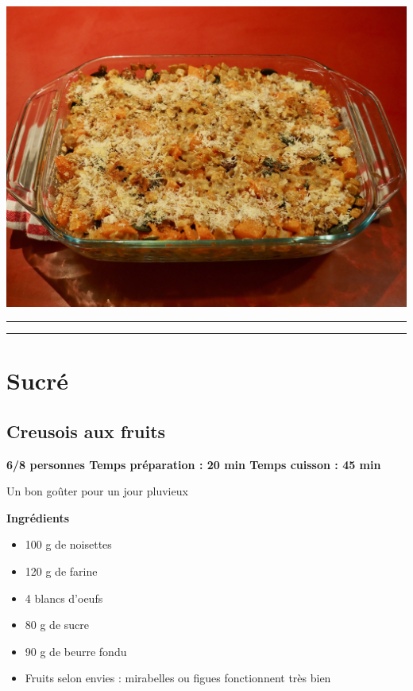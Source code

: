 \documentclass[]{book}
\providecommand{\tightlist}{%
  \setlength{\itemsep}{0pt}\setlength{\parskip}{0pt}}
\begin{document}
\begin{center}\includegraphics[width=0.9\linewidth]{photos/crozet} \end{center}

\begin{center}\rule{0.5\linewidth}{0.5pt}\end{center}

\begin{center}\rule{0.5\linewidth}{0.5pt}\end{center}

\section*{Sucré}\label{sucruxe9-3}

\subsection*{\texorpdfstring{{Creusois aux
fruits}}{Creusois aux fruits}}\label{creusois-aux-fruits}

\begin{sucrebox}
\textbf{6/8 personnes \textbar{} Temps préparation : 20 min \textbar{}
Temps cuisson : 45 min}

Un bon goûter pour un jour pluvieux
\end{sucrebox}

\textbf{Ingrédients}

\begin{itemize}
\tightlist
\item
  100 g de noisettes
\item
  120 g de farine
\item
  4 blancs d'oeufs
\item
  80 g de sucre
\item
  90 g de beurre fondu
\item
  Fruits selon envies : mirabelles ou figues fonctionnent très bien
\end{itemize}
\end{document}
